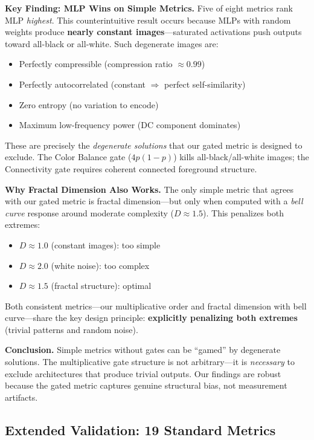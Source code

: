 \textbf{Key Finding: MLP Wins on Simple Metrics.}
Five of eight metrics rank MLP \emph{highest}. This counterintuitive result occurs because MLPs with random weights produce \textbf{nearly constant images}---saturated activations push outputs toward all-black or all-white. Such degenerate images are:
\begin{itemize}[topsep=2pt,itemsep=2pt]
    \item Perfectly compressible (compression ratio $\approx 0.99$)
    \item Perfectly autocorrelated (constant $\Rightarrow$ perfect self-similarity)
    \item Zero entropy (no variation to encode)
    \item Maximum low-frequency power (DC component dominates)
\end{itemize}

These are precisely the \emph{degenerate solutions} that our gated metric is designed to exclude. The Color Balance gate ($4p(1-p)$) kills all-black/all-white images; the Connectivity gate requires coherent connected foreground structure.

\textbf{Why Fractal Dimension Also Works.}
The only simple metric that agrees with our gated metric is fractal dimension---but only when computed with a \emph{bell curve} response around moderate complexity ($D \approx 1.5$). This penalizes both extremes:
\begin{itemize}[topsep=2pt,itemsep=2pt]
    \item $D \approx 1.0$ (constant images): too simple
    \item $D \approx 2.0$ (white noise): too complex
    \item $D \approx 1.5$ (fractal structure): optimal
\end{itemize}

Both consistent metrics---our multiplicative order and fractal dimension with bell curve---share the key design principle: \textbf{explicitly penalizing both extremes} (trivial patterns and random noise).

\textbf{Conclusion.} Simple metrics without gates can be ``gamed'' by degenerate solutions. The multiplicative gate structure is not arbitrary---it is \emph{necessary} to exclude architectures that produce trivial outputs. Our findings are robust because the gated metric captures genuine structural bias, not measurement artifacts.

\subsection{Extended Validation: 19 Standard Metrics}

